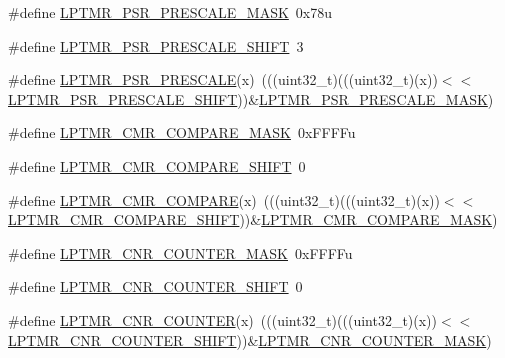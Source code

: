 \begin{DoxyCompactItemize}
\item 
\#define \hyperlink{group___l_p_t_m_r___register___masks_ga93a6fe3fb169a73716a837cedb92dbef}{L\+P\+T\+M\+R\+\_\+\+P\+S\+R\+\_\+\+P\+R\+E\+S\+C\+A\+L\+E\+\_\+\+M\+A\+SK}~0x78u
\item 
\#define \hyperlink{group___l_p_t_m_r___register___masks_ga7ed76902e13634d0c543ade3ef47525a}{L\+P\+T\+M\+R\+\_\+\+P\+S\+R\+\_\+\+P\+R\+E\+S\+C\+A\+L\+E\+\_\+\+S\+H\+I\+FT}~3
\item 
\#define \hyperlink{group___l_p_t_m_r___register___masks_ga37d8f4b0de3a75590548d8f3b6686b95}{L\+P\+T\+M\+R\+\_\+\+P\+S\+R\+\_\+\+P\+R\+E\+S\+C\+A\+LE}(x)~(((uint32\+\_\+t)(((uint32\+\_\+t)(x))$<$$<$\hyperlink{group___l_p_t_m_r___register___masks_ga7ed76902e13634d0c543ade3ef47525a}{L\+P\+T\+M\+R\+\_\+\+P\+S\+R\+\_\+\+P\+R\+E\+S\+C\+A\+L\+E\+\_\+\+S\+H\+I\+FT}))\&\hyperlink{group___l_p_t_m_r___register___masks_ga93a6fe3fb169a73716a837cedb92dbef}{L\+P\+T\+M\+R\+\_\+\+P\+S\+R\+\_\+\+P\+R\+E\+S\+C\+A\+L\+E\+\_\+\+M\+A\+SK})
\item 
\#define \hyperlink{group___l_p_t_m_r___register___masks_ga55cc95c022500b353f1724f2cbfe7a8f}{L\+P\+T\+M\+R\+\_\+\+C\+M\+R\+\_\+\+C\+O\+M\+P\+A\+R\+E\+\_\+\+M\+A\+SK}~0x\+F\+F\+F\+Fu
\item 
\#define \hyperlink{group___l_p_t_m_r___register___masks_gae1a525e22dc8b9c6960ae2e859a64232}{L\+P\+T\+M\+R\+\_\+\+C\+M\+R\+\_\+\+C\+O\+M\+P\+A\+R\+E\+\_\+\+S\+H\+I\+FT}~0
\item 
\#define \hyperlink{group___l_p_t_m_r___register___masks_gad61ee0ea43ca3e503c2c16ed1b7b1696}{L\+P\+T\+M\+R\+\_\+\+C\+M\+R\+\_\+\+C\+O\+M\+P\+A\+RE}(x)~(((uint32\+\_\+t)(((uint32\+\_\+t)(x))$<$$<$\hyperlink{group___l_p_t_m_r___register___masks_gae1a525e22dc8b9c6960ae2e859a64232}{L\+P\+T\+M\+R\+\_\+\+C\+M\+R\+\_\+\+C\+O\+M\+P\+A\+R\+E\+\_\+\+S\+H\+I\+FT}))\&\hyperlink{group___l_p_t_m_r___register___masks_ga55cc95c022500b353f1724f2cbfe7a8f}{L\+P\+T\+M\+R\+\_\+\+C\+M\+R\+\_\+\+C\+O\+M\+P\+A\+R\+E\+\_\+\+M\+A\+SK})
\item 
\#define \hyperlink{group___l_p_t_m_r___register___masks_ga134708aff0fe3bd31d703e32966c08fc}{L\+P\+T\+M\+R\+\_\+\+C\+N\+R\+\_\+\+C\+O\+U\+N\+T\+E\+R\+\_\+\+M\+A\+SK}~0x\+F\+F\+F\+Fu
\item 
\#define \hyperlink{group___l_p_t_m_r___register___masks_ga3769a974a3d95250e32bb154fa134c3f}{L\+P\+T\+M\+R\+\_\+\+C\+N\+R\+\_\+\+C\+O\+U\+N\+T\+E\+R\+\_\+\+S\+H\+I\+FT}~0
\item 
\#define \hyperlink{group___l_p_t_m_r___register___masks_ga8732990b7f3af802120a5e95000c963f}{L\+P\+T\+M\+R\+\_\+\+C\+N\+R\+\_\+\+C\+O\+U\+N\+T\+ER}(x)~(((uint32\+\_\+t)(((uint32\+\_\+t)(x))$<$$<$\hyperlink{group___l_p_t_m_r___register___masks_ga3769a974a3d95250e32bb154fa134c3f}{L\+P\+T\+M\+R\+\_\+\+C\+N\+R\+\_\+\+C\+O\+U\+N\+T\+E\+R\+\_\+\+S\+H\+I\+FT}))\&\hyperlink{group___l_p_t_m_r___register___masks_ga134708aff0fe3bd31d703e32966c08fc}{L\+P\+T\+M\+R\+\_\+\+C\+N\+R\+\_\+\+C\+O\+U\+N\+T\+E\+R\+\_\+\+M\+A\+SK})
\end{DoxyCompactItemize}


